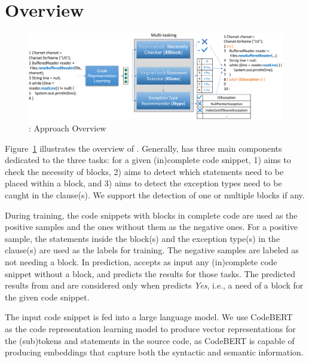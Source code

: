 \section{{\tool} Overview}
\label{sec:overview}

\begin{figure}[t] %
\begin{center}
\includegraphics[width=5.7in]{overview-6.png} %
\vspace{-10pt}
\caption{{\tool}: Approach Overview}
\label{overview}
\end{center}
\end{figure}

Figure~\ref{overview} illustrates the overview of {\tool}. Generally,
{\tool} has three main components dedicated to the three tasks: for a
given (in)complete code snippet, 1) {\xblock} aims to check the
necessity of  blocks, 2){\xstate} aims to detect which
statements need to be placed within a  block, and 3) {\xtype}
aims to detect the exception types need to be caught in the
 clause(s). We support the detection of one or multiple
 blocks if any.

During training, the code snippets with  blocks in
complete code are used as the positive samples and the ones without
them as the negative ones. For a positive sample, the statements
inside the  block(s) and the exception type(s) in the
 clause(s) are used as the labels for training. The negative
samples are labeled as not needing a  block. In
prediction, {\tool} accepts as input any (in)complete code
snippet without a  block, and predicts the results for
those tasks. The predicted results from {\xstate} and {\xtype} are
considered only when {\xblock} predicts {\em Yes}, i.e., a need of a
 block for the given code snippet.

The input code snippet is fed into a large language model. We use
CodeBERT~\cite{codebert-emnlp20} as the code representation learning
model to produce vector representations for the (sub)tokens and
statements in the source code, as CodeBERT is capable of producing
embeddings that capture both the syntactic and semantic information.

